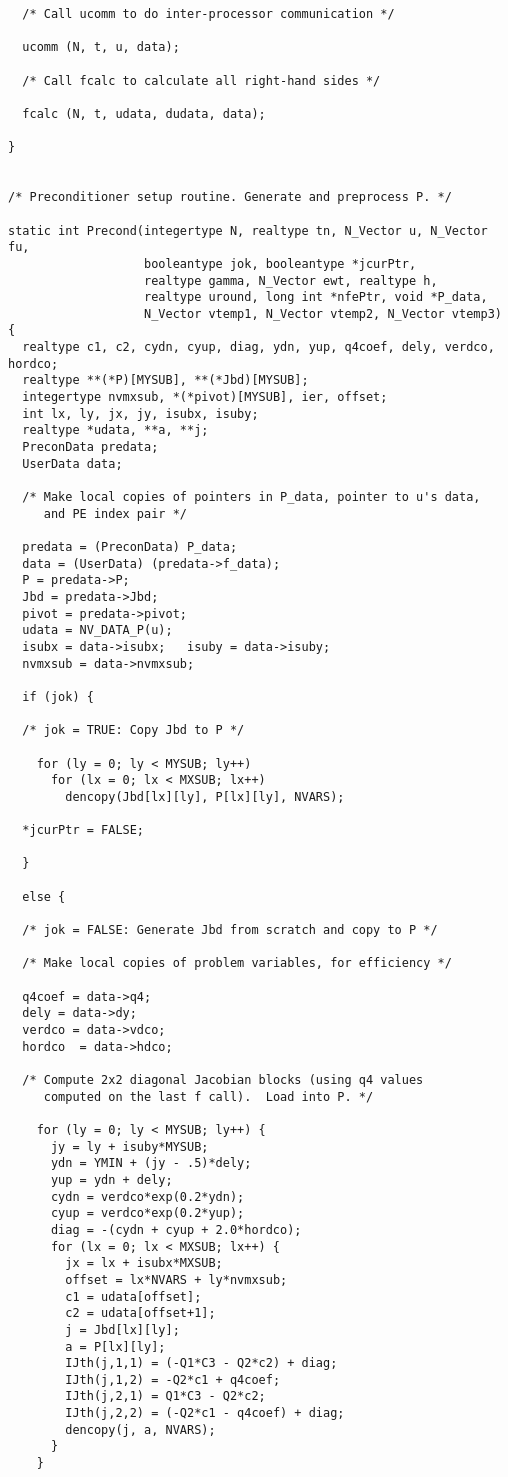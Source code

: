 \begin{verbatim}
  /* Call ucomm to do inter-processor communication */

  ucomm (N, t, u, data);

  /* Call fcalc to calculate all right-hand sides */

  fcalc (N, t, udata, dudata, data);

}


/* Preconditioner setup routine. Generate and preprocess P. */

static int Precond(integertype N, realtype tn, N_Vector u, N_Vector fu, 
                   booleantype jok, booleantype *jcurPtr, 
                   realtype gamma, N_Vector ewt, realtype h,
                   realtype uround, long int *nfePtr, void *P_data,
                   N_Vector vtemp1, N_Vector vtemp2, N_Vector vtemp3)
{
  realtype c1, c2, cydn, cyup, diag, ydn, yup, q4coef, dely, verdco, hordco;
  realtype **(*P)[MYSUB], **(*Jbd)[MYSUB];
  integertype nvmxsub, *(*pivot)[MYSUB], ier, offset;
  int lx, ly, jx, jy, isubx, isuby;
  realtype *udata, **a, **j;
  PreconData predata;
  UserData data;

  /* Make local copies of pointers in P_data, pointer to u's data,
     and PE index pair */

  predata = (PreconData) P_data;
  data = (UserData) (predata->f_data);
  P = predata->P;
  Jbd = predata->Jbd;
  pivot = predata->pivot;
  udata = NV_DATA_P(u);
  isubx = data->isubx;   isuby = data->isuby;
  nvmxsub = data->nvmxsub;

  if (jok) {

  /* jok = TRUE: Copy Jbd to P */

    for (ly = 0; ly < MYSUB; ly++)
      for (lx = 0; lx < MXSUB; lx++)
        dencopy(Jbd[lx][ly], P[lx][ly], NVARS);

  *jcurPtr = FALSE;

  }

  else {

  /* jok = FALSE: Generate Jbd from scratch and copy to P */

  /* Make local copies of problem variables, for efficiency */

  q4coef = data->q4;
  dely = data->dy;
  verdco = data->vdco;
  hordco  = data->hdco;

  /* Compute 2x2 diagonal Jacobian blocks (using q4 values 
     computed on the last f call).  Load into P. */

    for (ly = 0; ly < MYSUB; ly++) {
      jy = ly + isuby*MYSUB;
      ydn = YMIN + (jy - .5)*dely;
      yup = ydn + dely;
      cydn = verdco*exp(0.2*ydn);
      cyup = verdco*exp(0.2*yup);
      diag = -(cydn + cyup + 2.0*hordco);
      for (lx = 0; lx < MXSUB; lx++) {
        jx = lx + isubx*MXSUB;
        offset = lx*NVARS + ly*nvmxsub;
        c1 = udata[offset];
        c2 = udata[offset+1];
        j = Jbd[lx][ly];
        a = P[lx][ly];
        IJth(j,1,1) = (-Q1*C3 - Q2*c2) + diag;
        IJth(j,1,2) = -Q2*c1 + q4coef;
        IJth(j,2,1) = Q1*C3 - Q2*c2;
        IJth(j,2,2) = (-Q2*c1 - q4coef) + diag;
        dencopy(j, a, NVARS);
      }
    }


\end{verbatim}
